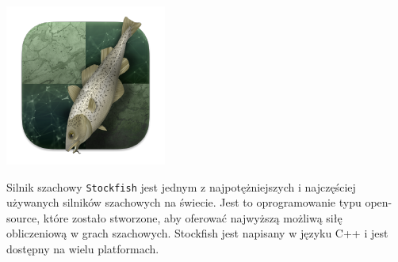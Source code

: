 \documentclass[twoside]{projektInzynierskiMS1}
\begin{document}
\begin{minipage}[t]{0.2\textwidth} 
    \vspace{0pt} 
    \centering
    \includegraphics[width=\linewidth]{images/stockfish_logo.png} 
\end{minipage} 
\hfill 
\begin{minipage}[t]{0.7\textwidth} 
    \vspace{0pt} 
    \justifying 
    \noindent 
    Silnik szachowy \texttt{Stockfish} jest jednym z najpotężniejszych i najczęściej używanych silników szachowych na świecie. Jest to oprogramowanie typu open-source, które zostało stworzone, aby oferować najwyższą możliwą siłę obliczeniową w grach szachowych. Stockfish jest napisany w języku C++ i jest dostępny na wielu platformach.
\end{minipage} 
\vspace{1cm}
\end{document}
